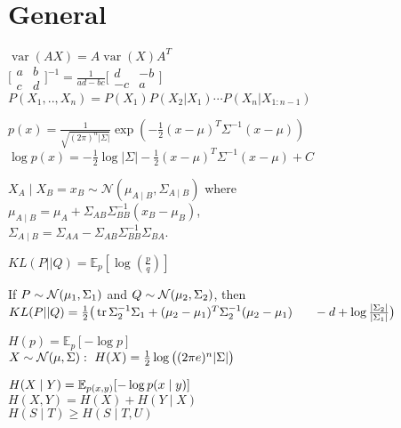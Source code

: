\section*{General}
$\operatorname{var}(AX)=A\operatorname{var}(X)A^T$\\
$\big[\begin{smallmatrix}
a&b \\ 
c&d
\end{smallmatrix}\big]^{-1}=\frac{1}{ad-bc}
\big[\begin{smallmatrix}
d&-b \\ 
-c&a
\end{smallmatrix}\big]
$\vspace*{1mm}\\
$P(X_1,..,X_n) = P(X_1)P(X_2| X_1)\cdots P(X_n|X_{1:n-1})$

$p(x)=\frac{1}{\sqrt{(2\pi)^{n}{|\Sigma|}}}\exp\left(-\frac{1}{2}(x-\mu)^T\Sigma^{-1}(x-\mu)\right)$\\
$\log p(x)=-\frac{1}{2}\log|\Sigma|-\frac{1}{2}(x-\mu)^T\Sigma^{-1}(x-\mu)+C$

$X_A \mid X_B = x_B \sim \mathcal{N}(\mu_{A\mid B}, \Sigma_{A\mid B})$ where\\ 
\hspace*{3mm} {$\mu_{A\mid B} = \mu_A + \Sigma_{AB} \Sigma_{BB}^{-1} (x_B - \mu_B)$},  \\
\hspace*{3mm} {$\Sigma_{A\mid B} = \Sigma_{AA} - \Sigma_{AB} \Sigma_{BB}^{-1} \Sigma_{BA}$}.

${KL}(P||Q) = \mathbb{E}_p[\log(\frac{p}{q})]$

If $P\sim\mathcal{N}(\mu_1,\Sigma_1)$ and $Q\sim\mathcal{N}(\mu_2,\Sigma_2)$, then
$KL(P||Q)=\frac{1}{2}\big(\operatorname{tr}\Sigma_2^{-1}\Sigma_1
+(\mu_2-\mu_1)^T\Sigma_2^{-1}(\mu_2-\mu_1)
\\\hspace*{6mm}-d+\log\frac{|\Sigma_2|}{|\Sigma_1|}\big)$

$H(p) = \mathbb{E}_p[-\log p]$\\
$X\sim\mathcal{N}(\mu, \Sigma): \ H(X) = \frac{1}{2}  \log\big((2\pi e)^n|\Sigma|\big)$

$H(X\mid Y)=\mathbb{E}_{p(x,y)}[-\log p(x\mid y)]$\\
$H(X,Y) = H(X) + H(Y \mid  X)$\\
$H(S \mid  T) \geq H(S \mid  T, U)$

